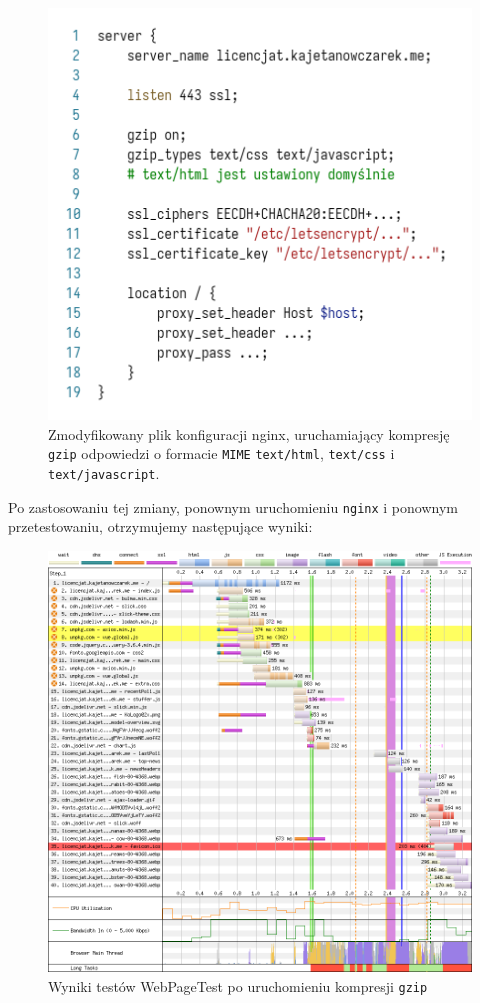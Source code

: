 \documentclass[licencjacka]{pracadypl}
\begin{document}
\begin{figure}[H]
  \centering
  \includegraphics[width=\linewidth/\real{1.55}]{images/code-nginx-conf-trunc-gzip.png}
  \caption{Zmodyfikowany plik konfiguracji nginx, uruchamiający kompresję \texttt{gzip} odpowiedzi o formacie \texttt{MIME} \texttt{text/html}, \texttt{text/css} i \texttt{text/javascript}.}
  \label{fig:nginx-after-gzip}
\end{figure}

Po zastosowaniu tej zmiany, ponownym uruchomieniu \texttt{nginx} i ponownym przetestowaniu, otrzymujemy następujące wyniki:
\begin{figure}[H]
  \includegraphics[width=\linewidth]{images/waterfall-after-gzip.png}
  \caption{Wyniki testów WebPageTest po uruchomieniu kompresji \texttt{gzip}}
  \label{fig:waterfall-after-gzip}
\end{figure}
\end{document}
